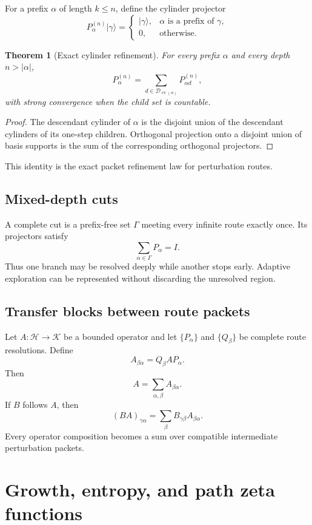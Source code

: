 \documentclass[11pt,openany]{report}
\newtheorem{theorem}{Theorem}[chapter]
\theoremstyle{definition}
\theoremstyle{remark}
\newcommand{\Dcal}{\mathcal D}
\newcommand{\ev}{\operatorname{ev}}
\newcommand{\abs}[1]{\left\lvert #1\right\rvert}
\begin{document}
For a prefix $\alpha$ of length $k\le n$, define the cylinder projector
\[
P^{(n)}_\alpha
\lvert\gamma\rangle
=
\begin{cases}
\lvert\gamma\rangle,&\alpha\text{ is a prefix of }\gamma,\\
0,&\text{otherwise}.
\end{cases}
\]

\begin{theorem}[Exact cylinder refinement]
For every prefix $\alpha$ and every depth $n>\abs{\alpha}$,
\[
\boxed{
P^{(n)}_\alpha
=
\sum_{d\in\Dcal_{\ev(\alpha)}}P^{(n)}_{\alpha d},
}
\]
with strong convergence when the child set is countable.
\end{theorem}

\begin{proof}
The descendant cylinder of $\alpha$ is the disjoint union of the descendant cylinders of its one-step children. Orthogonal projection onto a disjoint union of basis supports is the sum of the corresponding orthogonal projectors.
\end{proof}

This identity is the exact packet refinement law for perturbation routes.

\section{Mixed-depth cuts}

A complete cut is a prefix-free set $\Gamma$ meeting every infinite route exactly once. Its projectors satisfy
\[
\sum_{\alpha\in\Gamma}P_\alpha=I.
\]
Thus one branch may be resolved deeply while another stops early. Adaptive exploration can be represented without discarding the unresolved region.

\section{Transfer blocks between route packets}

Let $A:\mathcal H\to\mathcal K$ be a bounded operator and let $\{P_\alpha\}$ and $\{Q_\beta\}$ be complete route resolutions. Define
\[
A_{\beta\alpha}=Q_\beta A P_\alpha.
\]
Then
\[
A=\sum_{\alpha,\beta}A_{\beta\alpha}.
\]
If $B$ follows $A$, then
\[
(BA)_{\gamma\alpha}
=
\sum_\beta B_{\gamma\beta}A_{\beta\alpha}.
\]
Every operator composition becomes a sum over compatible intermediate perturbation packets.

\chapter{Growth, entropy, and path zeta functions}
\end{document}
